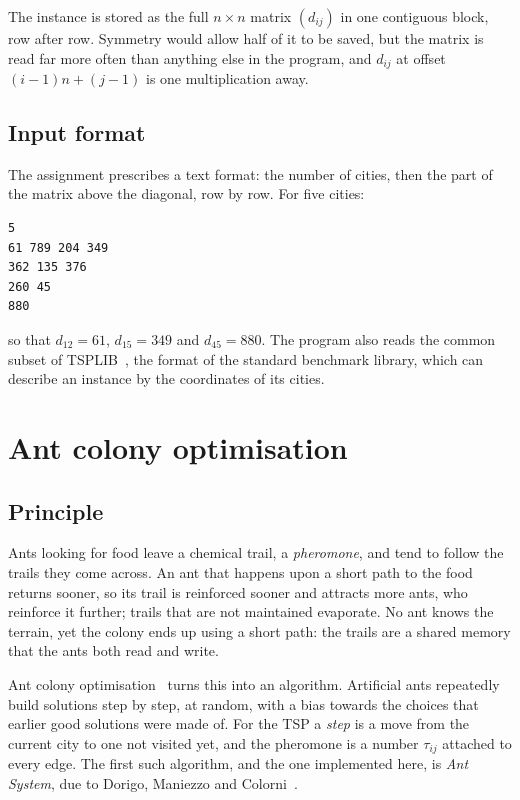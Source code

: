 \documentclass[11pt,a4paper]{article}
\begin{document}
The instance is stored as the full $n\times n$ matrix $(d_{ij})$ in one contiguous block,
row after row. Symmetry would allow half of it to be saved, but the matrix is read far
more often than anything else in the program, and $d_{ij}$ at offset $(i-1)n+(j-1)$ is one
multiplication away.

\subsection{Input format}

The assignment prescribes a text format: the number of cities, then the part of the
matrix above the diagonal, row by row. For five cities:

\begin{lstlisting}
5
61 789 204 349
362 135 376
260 45
880
\end{lstlisting}

\noindent
so that $d_{12}=61$, $d_{15}=349$ and $d_{45}=880$. The program also reads the common
subset of TSPLIB~\cite{reinelt1991tsplib}, the format of the standard benchmark library,
which can describe an instance by the coordinates of its cities.

\section{Ant colony optimisation}
\label{sec:aco}

\subsection{Principle}

Ants looking for food leave a chemical trail, a \emph{pheromone}, and tend to follow the
trails they come across. An ant that happens upon a short path to the food returns sooner,
so its trail is reinforced sooner and attracts more ants, who reinforce it further; trails
that are not maintained evaporate. No ant knows the terrain, yet the colony ends up using a
short path: the trails are a shared memory that the ants both read and write.

Ant colony optimisation~\cite{dorigo2004aco} turns this into an algorithm. Artificial ants
repeatedly build solutions step by step, at random, with a bias towards the choices that
earlier good solutions were made of. For the TSP a \emph{step} is a move from the current
city to one not visited yet, and the pheromone is a number $\tau_{ij}$ attached to every
edge. The first such algorithm, and the one implemented here, is \emph{Ant System}, due to
Dorigo, Maniezzo and Colorni~\cite{dorigo1996ant}.
\end{document}

